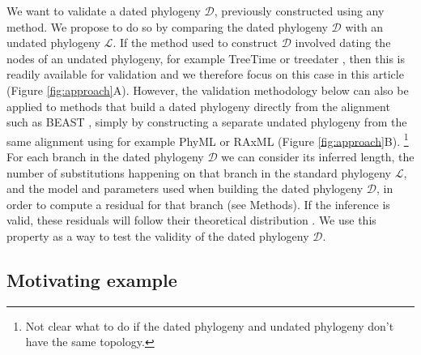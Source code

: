 \documentclass{article}
\begin{document}
We want to validate a dated phylogeny $\mathcal{D}$, previously constructed using
any method. We propose to do so by comparing the dated phylogeny $\mathcal{D}$ with 
an undated phylogeny $\mathcal{L}$. 
If the method used to construct $\mathcal{D}$ involved dating the nodes of an undated
phylogeny, for example TreeTime \citep{Sagulenko2018} or treedater \citep{Volz2017}, 
then this is readily available for validation and we therefore focus on this case in this article
(Figure \ref{fig:approach}A). However, the validation methodology
below can also be applied to methods that build a dated phylogeny directly from the alignment
such as BEAST \citep{Suchard2018},
simply by constructing a separate undated phylogeny from the same alignment using
for example PhyML \citep{Guindon2010} or RAxML \citep{Stamatakis2015} 
(Figure \ref{fig:approach}B). 
\footnote{Not clear what to do if the dated phylogeny and undated phylogeny don't have the same topology.}
For each branch in the dated phylogeny $\mathcal{D}$ we can
consider its inferred length, the number of substitutions happening on that branch in the standard phylogeny
$\mathcal{L}$, and the model and parameters used when building the dated phylogeny $\mathcal{D}$,
in order to compute a residual for that branch (see Methods). If the inference is valid,
these residuals will follow their theoretical distribution
\citep{coxGeneralDefinitionResiduals1968,dunnRandomizedQuantileResiduals1996}. 
We use this property as a way to test the validity of the dated phylogeny $\mathcal{D}$.

\subsection*{Motivating example}
\end{document}
